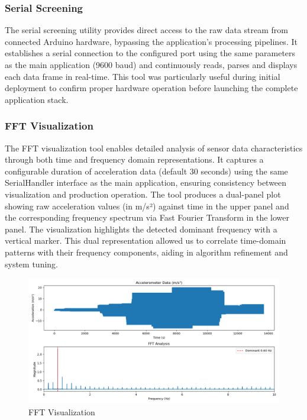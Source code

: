 \documentclass{article}
\begin{document}
    \subsubsection{Serial Screening}
    The serial screening utility provides direct access to the raw data stream from connected Arduino hardware, bypassing the application's processing pipelines. It establishes a serial connection to the configured port using the same parameters as the main application (9600 baud) and continuously reads, parses and displays each data frame in real-time. This tool was particularly useful during initial deployment to confirm proper hardware operation before launching the complete application stack.

    \subsubsection{FFT Visualization}
    The FFT visualization tool enables detailed analysis of sensor data characteristics through both time and frequency domain representations. It captures a configurable duration of acceleration data (default 30 seconds) using the same SerialHandler interface as the main application, ensuring consistency between visualization and production operation. The tool produces a dual-panel plot showing raw acceleration values (in m/s²) against time in the upper panel and the corresponding frequency spectrum via Fast Fourier Transform in the lower panel. The visualization highlights the detected dominant frequency with a vertical marker. This dual representation allowed us to correlate time-domain patterns with their frequency components, aiding in algorithm refinement and system tuning.

    \begin{figure} [h]
        \centering
        \includegraphics[width=1\linewidth]{assets/fft_visualization.png}
        \caption{FFT Visualization}
        \label{fig:enter-label}
    \end{figure}
\end{document}
